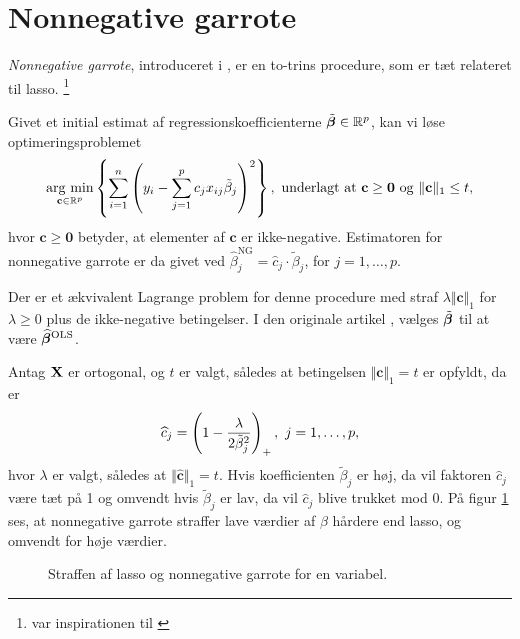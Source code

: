 \section{Nonnegative garrote} \label{sec:nonnegativegarrote}
\textit{Nonnegative garrote}, introduceret i \citep{nonnegative_garrote}, er en to-trins procedure, som er tæt relateret til lasso. \footnote{\citep{nonnegative_garrote} var inspirationen til \citep{lasso}} 
\begin{defn}
Givet et initial estimat af regressionskoefficienterne \(\tilde{\boldsymbol{\beta}} \in \mathbb{R}^p\), kan vi løse optimeringsproblemet
\begin{align}
\argmin_{\mathbf{c} \in \mathbb{R}^p}  \cbr{ \sum_{i=1}^n \del{y_i - \sum_{j=1}^p c_j x_{ij} \tilde{\beta}_j}^2}, \ \text{underlagt at } \mathbf{c} \geq \mathbf{0} \text{ og } \Vert \mathbf{c} \Vert_1 \leq t, \label{eq:2.19}
\end{align}
hvor \(\mathbf{c} \geq \mathbf{0}\) betyder, at elementer af \(\mathbf{c}\) er ikke-negative.
Estimatoren for nonnegative garrote er da givet ved \(\widehat{\beta}_j^\text{NG} = \widehat{c}_j \cdot \tilde{\beta}_j\), for \(j = 1, \ldots, p\).
\end{defn}
Der er et ækvivalent Lagrange problem for denne procedure med straf \(\lambda \Vert \mathbf{c} \Vert_1\) for \(\lambda \geq 0\) plus de ikke-negative betingelser.
I den originale artikel \citep{nonnegative_garrote}, vælges \(\tilde{\boldsymbol{\beta}}\) til at være \(\widehat{\boldsymbol{\beta}}^\text{OLS}\).
 
Antag \(\mathbf{X}\) er ortogonal, og \(t\) er valgt, således at betingelsen \(\Vert \mathbf{c} \Vert_1 = t\) er opfyldt, da er
\begin{align*}
\widehat{c}_j = \del{1 - \frac{\lambda}{2\tilde{\beta}_j^2}}_+, \ j = 1, \ldots, p,
\end{align*}
hvor \(\lambda\) er valgt, således at \(\Vert \widehat{\mathbf{c}} \Vert_1 = t\).
Hvis koefficienten \(\tilde{\beta}_j\) er høj, da vil faktoren \(\widehat{c}_j\) være tæt på 1 og omvendt hvis \(\tilde{\beta}_j\) er lav, da vil \(\widehat{c}_j\) blive trukket mod 0.
På figur \ref{fig:nonnegative_garrote} ses, at nonnegative garrote straffer lave værdier af \(\beta\) hårdere end lasso, og omvendt for høje værdier.
%
\begin{figure}[H]
\centering
\scalebox{0.8}{}
\caption{Straffen af lasso og nonnegative garrote for en variabel. 
} \label{fig:nonnegative_garrote}
\end{figure}
%

